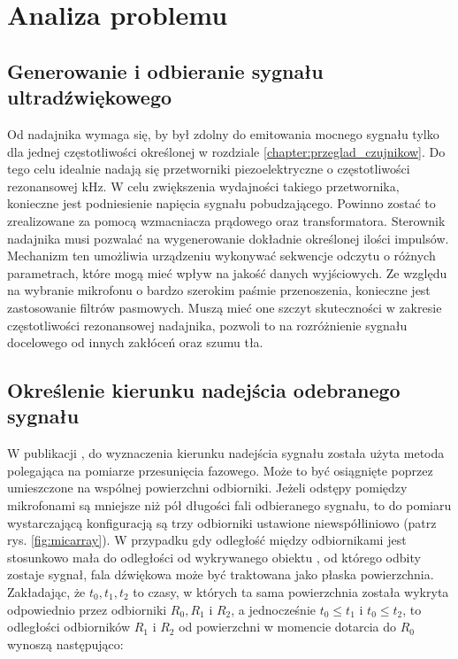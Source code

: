 \chapter[Analiza problemu]{Analiza problemu}

\label{chapter:analiza_problemu}



\section{Generowanie i odbieranie sygnału ultradźwiękowego}

Od nadajnika wymaga się, by był zdolny do emitowania mocnego sygnału tylko dla jednej częstotliwości określonej w rozdziale \ref{chapter:przeglad_czujnikow}.
Do tego celu idealnie nadają się przetworniki piezoelektryczne o częstotliwości rezonansowej \unit[40]{kHz}. W celu zwiększenia wydajności takiego przetwornika,
konieczne jest podniesienie napięcia sygnału pobudzającego. Powinno zostać to zrealizowane za pomocą wzmacniacza prądowego oraz transformatora. 
Sterownik nadajnika musi pozwalać na wygenerowanie dokładnie określonej ilości impulsów. 
Mechanizm ten umożliwia urządzeniu wykonywać sekwencje odczytu o różnych parametrach, które mogą mieć wpływ na jakość danych wyjściowych. 
Ze względu na wybranie mikrofonu o bardzo szerokim paśmie przenoszenia, konieczne jest zastosowanie filtrów pasmowych. 
Muszą mieć one szczyt skuteczności w zakresie częstotliwości rezonansowej nadajnika, pozwoli to na rozróżnienie sygnału docelowego od innych zakłóceń oraz szumu tła.



\section{Określenie kierunku nadejścia odebranego sygnału}
W publikacji \cite{Kreczmer:2020:Azimuth:Elevation},
do wyznaczenia kierunku nadejścia sygnału została użyta metoda polegająca na pomiarze przesunięcia fazowego.
Może to być osiągnięte poprzez umieszczone na wspólnej powierzchni odbiorniki. 
Jeżeli odstępy pomiędzy mikrofonami są mniejsze niż pół długości fali odbieranego sygnału, 
to do pomiaru wystarczającą konfiguracją są trzy odbiorniki ustawione niewspółliniowo (patrz rys. \ref{fig:micarray}).
W przypadku gdy odległość między odbiornikami jest stosunkowo mała do odległości od wykrywanego obiektu , 
od którego odbity zostaje sygnał, fala dźwiękowa może być traktowana jako płaska powierzchnia. 
Zakładając, że $ t_0, t_1, t_2 $ to czasy, w których ta sama powierzchnia została wykryta odpowiednio przez odbiorniki $R_0, R_1$ i $R_2$, 
a jednocześnie $t_0 \leq t_1$ i $t_0 \leq t_2$, to odległości odbiorników $R_1$ i $R_2$ 
od powierzchni w momencie dotarcia do $R_0$ wynoszą następująco:

